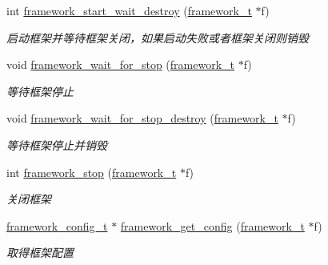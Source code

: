 \begin{DoxyCompactItemize}
int \hyperlink{a00102_ga4af709f98e2bd206da043cc29f915c99_ga4af709f98e2bd206da043cc29f915c99}{framework\+\_\+start\+\_\+wait\+\_\+destroy} (\hyperlink{a00050_a6149d769f6f07ed14a40a271c95d8463_a6149d769f6f07ed14a40a271c95d8463}{framework\+\_\+t} $\ast$f)
\begin{DoxyCompactList}\small\item\em 启动框架并等待框架关闭，如果启动失败或者框架关闭则销毁 \end{DoxyCompactList}\item 
void \hyperlink{a00102_gaefec7da1b548ddb97c73c8924ba17069_gaefec7da1b548ddb97c73c8924ba17069}{framework\+\_\+wait\+\_\+for\+\_\+stop} (\hyperlink{a00050_a6149d769f6f07ed14a40a271c95d8463_a6149d769f6f07ed14a40a271c95d8463}{framework\+\_\+t} $\ast$f)
\begin{DoxyCompactList}\small\item\em 等待框架停止 \end{DoxyCompactList}\item 
void \hyperlink{a00102_gada1de96de1586411c77b5357a7b2376a_gada1de96de1586411c77b5357a7b2376a}{framework\+\_\+wait\+\_\+for\+\_\+stop\+\_\+destroy} (\hyperlink{a00050_a6149d769f6f07ed14a40a271c95d8463_a6149d769f6f07ed14a40a271c95d8463}{framework\+\_\+t} $\ast$f)
\begin{DoxyCompactList}\small\item\em 等待框架停止并销毁 \end{DoxyCompactList}\item 
int \hyperlink{a00102_ga429be76d09278d6170f1b519f4dbb689_ga429be76d09278d6170f1b519f4dbb689}{framework\+\_\+stop} (\hyperlink{a00050_a6149d769f6f07ed14a40a271c95d8463_a6149d769f6f07ed14a40a271c95d8463}{framework\+\_\+t} $\ast$f)
\begin{DoxyCompactList}\small\item\em 关闭框架 \end{DoxyCompactList}\item 
\hyperlink{a00050_a55b26efa9e6ee05514d087ba2593a54b_a55b26efa9e6ee05514d087ba2593a54b}{framework\+\_\+config\+\_\+t} $\ast$ \hyperlink{a00102_gaf0524cc257c8e57ba11d676dcca6bf64_gaf0524cc257c8e57ba11d676dcca6bf64}{framework\+\_\+get\+\_\+config} (\hyperlink{a00050_a6149d769f6f07ed14a40a271c95d8463_a6149d769f6f07ed14a40a271c95d8463}{framework\+\_\+t} $\ast$f)
\begin{DoxyCompactList}\small\item\em 取得框架配置 \end{DoxyCompactList}\end{DoxyCompactItemize}


